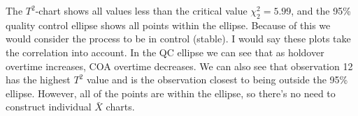 The $T^{2}$-chart shows all values less than the critical value $\chi_{2}^{2} = 5.99$, and the 95\% quality control ellipse shows all points within the ellipse. Because of this we would consider the process to be in control (stable). I would say these plots take the correlation into account. In the QC ellipse we can see that as holdover overtime increases, COA overtime decreases. We can also see that observation 12 has the highest $T^{2}$ value and is the observation closest to being outside the 95\% ellipse. However, all of the points are within the ellipse, so there's no need to construct individual $\bar{X}$ charts.